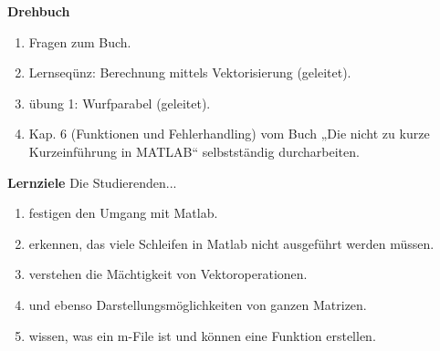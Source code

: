 \textbf{Drehbuch}
\begin{enumerate}
\item Fragen zum Buch.
\item Lernseqünz: Berechnung mittels Vektorisierung (geleitet).
\item übung 1: Wurfparabel (geleitet).
\item Kap. 6 (Funktionen und Fehlerhandling) vom Buch „Die nicht zu kurze Kurzeinführung in MATLAB“ selbstständig durcharbeiten.
\end{enumerate}
\textbf{Lernziele}
Die Studierenden...
\begin{enumerate}
\item festigen den Umgang mit Matlab.
\item erkennen, das viele Schleifen in Matlab nicht ausgeführt werden müssen.
\item verstehen die Mächtigkeit von Vektoroperationen.
\item und ebenso Darstellungsmöglichkeiten von ganzen Matrizen.
\item wissen, was ein m-File ist und können eine Funktion erstellen.
\end{enumerate}
